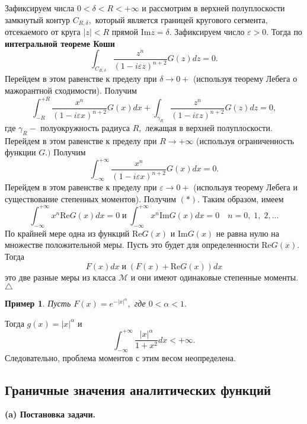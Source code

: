 \documentclass[12 pt, a4 paper]{article}
\theoremstyle{plain}   \newtheorem{Pro}{Задача}
\newtheorem{Exa}{Пример}
\begin{document}
Зафиксируем числа
$ 0<\delta <R<+\infty $
и рассмотрим в верхней полуплоскости замкнутый контур
$ C_{R, \delta} , $
который является границей кругового сегмента,
отсекаемого от круга
$ |z|<R $
прямой
$ \mathrm {Im}z=\delta . $
Зафиксируем число
$ \varepsilon >0. $
Тогда по
{\bfseries интегральной теореме Коши}
$$
  \int _{C_{R,\delta}}
  \frac{z^n}{(1-i\varepsilon z)^{n+2}}G(z)dz=0.
$$
Перейдем в этом равенстве к пределу при
$ \delta \rightarrow 0+ $
(используя теорему Лебега о мажорантной сходимости). Получим
$$
  \int _{-R}^{+R} \frac{x^n}{(1-i\varepsilon x)^{n+2}}G(x)dx+
  \int _{\gamma _R} \frac{z^n}{(1-i\varepsilon z)^{n+2}}
  G(z)dz=0,
$$
где
$ \gamma _R - $
полуокружность радиуса
$ R , $
лежащая в верхней полуплоскости. Перейдем в этом равенстве к пределу
при
$ R \rightarrow +\infty $
(используя ограниченность функции
$ G . ) $
Получим
$$
  \int _{-\infty}^{+\infty}
  \frac{x^n}{(1-i\varepsilon x)^{n+2}}G(x)dx=0.
$$
Перейдем в этом равенстве к пределу при
$ \varepsilon \rightarrow 0+ $
(используя теорему Лебега и существование степенных моментов).
Получим
$ (\ast ) . $
Таким образом, имеем
$$
  \int _{-\infty}^{+\infty}x^n \mathrm{Re}G(x)dx=0 \; и \;
  \int _{-\infty}^{+\infty}x^n \mathrm{Im}G(x)dx=0
  \quad n=0, \; 1, \; 2,...
$$
По крайней мере одна из функций
$ \mathrm{Re}G(x) $
и
$ \mathrm{Im}G(x) $
не равна нулю на множестве положительной меры. Пусть это будет
для определенности
$ \mathrm{Re}G(x) . $
Тогда
$$
  F(x)dx \; и \; (F(x)+\mathrm{Re}G(x))dx
$$
это две разные меры из класса
$ \mathcal{M} $
и они имеют одинаковые степенные моменты.
\\
$ \triangle $
\begin{Exa}
Пусть
$ F(x)=e^{-|x|^{\alpha}} , $
где
$ 0<\alpha <1. $
\end{Exa}
Тогда
$ g(x)=|x|^{\alpha} $
и
$$
  \int _{-\infty}^{+\infty}
  \frac{|x|^{\alpha}}{1+x^2}dx<+\infty .
$$
Следовательно, проблема моментов с этим весом неопределена.
\newpage
\subsection{Граничные значения аналитических функций}
{\bfseries (a) Постановка задачи.}  \\
\end{document}

